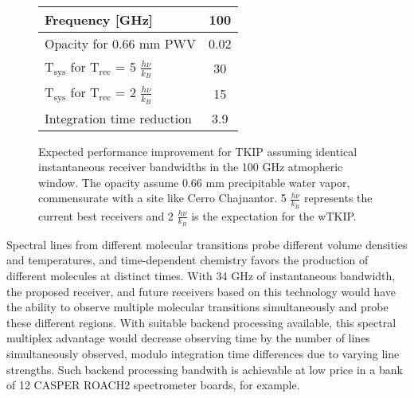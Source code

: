   \begin{wrapfigure}{L}{0.4\textwidth}
    \vspace{-20pt}
  	  \centering
    \begin{tabular}{lc}
    \toprule
    Frequency [GHz] & 100  \\
    \midrule
    Opacity for 0.66 mm PWV & 0.02 \\
    T$_\text{sys}$ for T$_\text{rec}$ = 5 $\frac{h \nu}{k_B}$ & 30 \\
    T$_\text{sys}$ for T$_\text{rec}$ = 2 $\frac{h \nu}{k_B}$ & 15 \\
	Integration time reduction & 3.9 \\
    \bottomrule
    \end{tabular}%


     \vspace{-10pt}
  \caption{Expected performance improvement for TKIP assuming identical instantaneous receiver bandwidths in the 100 GHz  atmopheric window. The opacity assume  0.66 mm precipitable water vapor, commensurate with a site like Cerro Chajnantor. 5 $\frac{h \nu}{k_B}$ represents the current best receivers and 2 $\frac{h \nu}{k_B}$ is the expectation for the wTKIP.}
      \vspace{-10pt}
  \label{tab:ALMA_wTKIP}%
   \end{wrapfigure}
Spectral lines from different molecular transitions probe different volume densities and temperatures, and time-dependent chemistry favors the production of different molecules at distinct times. With 34 GHz of instantaneous bandwidth, the proposed receiver, and future receivers based on this technology would have the ability to observe multiple molecular transitions simultaneously and probe these different regions. With suitable backend processing available, this spectral multiplex advantage would decrease observing time by the number of lines simultaneously observed, modulo integration time differences due to varying line strengths. Such backend processing bandwith is achievable at low price in a bank of 12 CASPER ROACH2 spectrometer boards, for example. 


%
%
 
